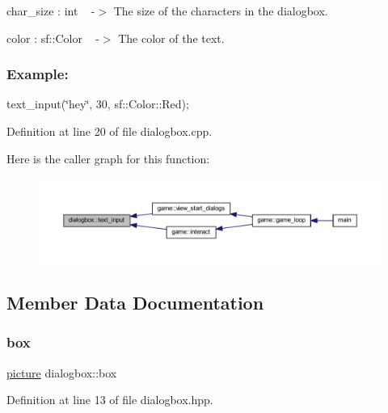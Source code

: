 char\+\_\+size \+: int ~\newline
-\/$>$ The size of the characters in the dialogbox.

color \+: sf\+::\+Color ~\newline
-\/$>$ The color of the text.

\subsubsection*{Example\+: }

text\+\_\+input(\char`\"{}hey\char`\"{}, 30, sf\+::\+Color\+::\+Red); 

Definition at line 20 of file dialogbox.\+cpp.

Here is the caller graph for this function\+:
\nopagebreak
\begin{figure}[H]
\begin{center}
\leavevmode
\includegraphics[width=350pt]{classdialogbox_ab9d8f8b65c3a54ccaea57a941d43a176_icgraph}
\end{center}
\end{figure}


\subsection{Member Data Documentation}
\mbox{\label{classdialogbox_aa0686bdcc541c36e19ba3122befe1978}} 
\subsubsection{\texorpdfstring{box}{box}}
{\footnotesize\ttfamily \hyperlink{classpicture}{picture} dialogbox\+::box\hspace{0.3cm}{\ttfamily [private]}}



Definition at line 13 of file dialogbox.\+hpp.

\mbox{\label{classdialogbox_a37ebf2968cfa80f0cdde35d2722f40ad}} 
